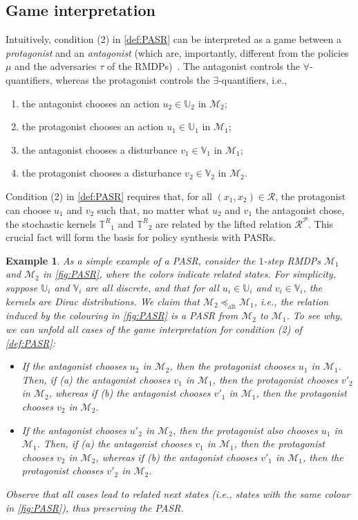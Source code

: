 \documentclass[letterpaper, 10 pt, conference]{ieeeconf}  %
\newtheorem{example}{Example}
\newcommand*{\policy}{\ensuremath{\mu}}
\newcommand*{\Actions}{\ensuremath{\mathbb{U}}}
\newcommand*{\Disturb}{\ensuremath{\mathbb{V}}}
\newcommand*{\transfuncR}{\ensuremath{\mathbb{T}^R}}
\newcommand*{\rmdp}{{\ensuremath{\mathcal{M}}}}
\newcommand*{\adversary}{\ensuremath{\tau}}
\newcommand*{\Relation}{\mathcal{R}}
\newcommand*{\liftRelation}{\mathcal{R}^\mathcal{P}}
\begin{document}
\subsection{Game interpretation}
Intuitively, condition (2) in \cref{def:PASR} can be interpreted as a game between a \emph{protagonist} and an \emph{antagonist} (which are, importantly, different from the policies $\policy$ and the adversaries $\adversary$ of the RMDPs)~\cite{DBLP:conf/concur/AlurHKV98}.
The antagonist controls the $\forall$-quantifiers, whereas the protagonist controls the $\exists$-quantifiers, i.e.,
\begin{enumerate}
    \item the antagonist chooses an action $u_2 \in \Actions_2$ in $\rmdp_2$;
    \item the protagonist chooses an action $u_1 \in \Actions_1$ in $\rmdp_1$;
    \item the antagonist chooses a disturbance $v_1 \in \Disturb_1$ in $\rmdp_1$;
    \item the protagonist chooses a disturbance $v_2 \in \Disturb_2$ in $\rmdp_2$.
\end{enumerate}
Condition (2) in \cref{def:PASR} requires that, for all $(x_1, x_2) \in \Relation$, the protagonist can choose $u_1$ and $v_2$ such that, no matter what $u_2$ and $v_1$ the antagonist chose, the stochastic kernels $\transfuncR_1$ and $\transfuncR_2$ are related by the lifted relation $\liftRelation$.
This crucial fact will form the basis for policy synthesis with PASRs.

\begin{example}
    \label{example:PASR}
    As a simple example of a PASR, consider the $1$-step RMDPs $\rmdp_1$ and $\rmdp_2$ in \cref{fig:PASR}, where the colors indicate related states.
    For simplicity, suppose $\Actions_i$ and $\Disturb_i$ are all discrete, and that for all $u_i \in \Actions_i$ and $v_i \in \Disturb_i$, the kernels are Dirac distributions.
    We claim that $\rmdp_2 \preceq_\text{alt} \rmdp_1$, i.e., the relation induced by the colouring in \cref{fig:PASR} is a PASR from $\rmdp_2$ to $\rmdp_1$.
    To see why, we can unfold all cases of the game interpretation for condition (2) of \cref{def:PASR}: 
    \begin{itemize}
        \item If the antagonist chooses $u_2$ in $\rmdp_2$, then the protagonist chooses $u_1$ in $\rmdp_1$. Then, if
            (a) the antagonist chooses $v_1$ in $\rmdp_1$, then the protagonist chooses $v'_2$ in $\rmdp_2$, whereas if
            (b) the antagonist chooses $v'_1$ in $\rmdp_1$, then the protagonist chooses $v_2$ in $\rmdp_2$.
        \item If the antagonist chooses $u'_2$ in $\rmdp_2$, then the protagonist also chooses $u_1$ in $\rmdp_1$. Then, if
            (a) the antagonist chooses $v_1$ in $\rmdp_1$, then the protagonist chooses $v_2$ in $\rmdp_2$, whereas if
            (b) the antagonist chooses $v'_1$ in $\rmdp_1$, then the protagonist chooses $v'_2$ in $\rmdp_2$.
    \end{itemize}
    Observe that all cases lead to related next states (i.e., states with the same colour in \cref{fig:PASR}), thus preserving the PASR.
\end{example}
\end{document}
